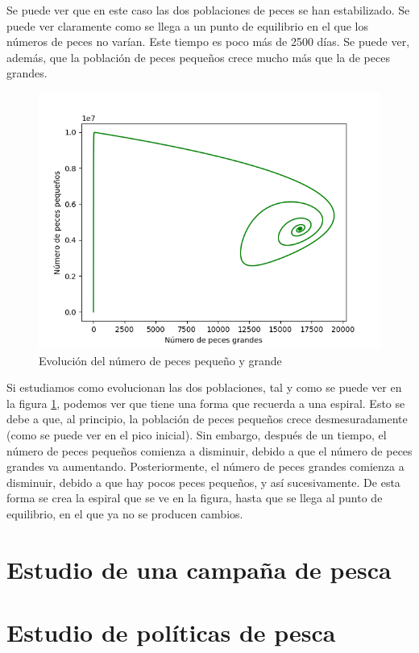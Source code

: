 \documentclass[11pt,a4paper]{report}
\begin{document}
Se puede ver que en este caso las dos poblaciones de peces se han estabilizado. Se puede ver claramente como se llega
a un punto de equilibrio en el que los números de peces no varían. Este tiempo es poco más de 2500 días. Se puede ver,
además, que la población de peces pequeños crece mucho más que la de peces grandes.

\begin{figure}[H]
\centering
\includegraphics[scale=0.52]{img/peces-1500-3.png}
\caption{Evolución del número de peces pequeño y grande}
\label{fig:peces-peq-grand}
\end{figure}

Si estudiamos como evolucionan las dos poblaciones, tal y como se puede ver en la figura \ref{fig:peces-peq-grand}, podemos
ver que tiene una forma que recuerda a una espiral. Esto se debe a que, al principio, la población de peces pequeños crece
desmesuradamente (como se puede ver en el pico inicial). Sin embargo, después de un tiempo, el número de peces pequeños
comienza a disminuir, debido a que el número de peces grandes va aumentando. Posteriormente, el número de peces grandes
comienza a disminuir, debido a que hay pocos peces pequeños, y así sucesivamente. De esta forma se crea la espiral que
se ve en la figura, hasta que se llega al punto de equilibrio, en el que ya no se producen cambios.

\section{Estudio de una campaña de pesca}

\section{Estudio de políticas de pesca}
\end{document}
